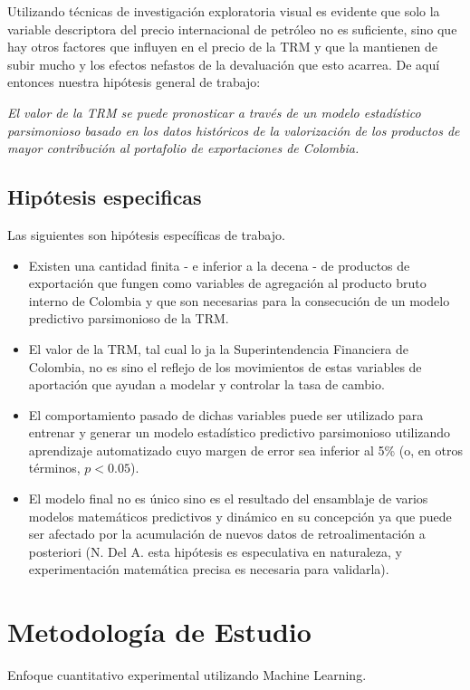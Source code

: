 \begin{spacing}{1.5}
Utilizando técnicas de investigación exploratoria visual es evidente que solo la variable descriptora del precio internacional de petróleo no es suficiente, sino que hay otros factores que influyen en el precio de la TRM y que la mantienen de subir mucho y los efectos nefastos de la devaluación que esto acarrea. De aquí entonces nuestra hipótesis general de trabajo:

\emph{El valor de la TRM se puede pronosticar a través de un modelo estadístico parsimonioso basado en los datos históricos de la valorización de los productos de mayor contribución al portafolio de exportaciones de Colombia.}

\subsection{Hipótesis especificas}
Las siguientes son hipótesis específicas de trabajo.

\begin{itemize}
	\item Existen una cantidad finita - e inferior a la decena - de productos de exportación que fungen como variables de agregación al producto bruto interno de Colombia y que son necesarias para la consecución de un modelo predictivo parsimonioso de la TRM.
	\item El valor de la TRM, tal cual lo ja la Superintendencia Financiera de Colombia, no es sino el reflejo de los movimientos de estas variables de aportación que ayudan a modelar y controlar la tasa de cambio.
	\item El comportamiento pasado de dichas variables puede ser utilizado para entrenar y generar un modelo estadístico predictivo parsimonioso utilizando aprendizaje automatizado cuyo margen de error sea inferior al 5\% (o, en otros términos, \(p < 0.05\)).
	\item El modelo final no es único sino es el resultado del ensamblaje de varios modelos matemáticos predictivos y dinámico en su concepción ya que puede ser afectado por la acumulación de nuevos datos de retroalimentación a posteriori (N. Del A. esta hipótesis es especulativa en naturaleza, y experimentación matemática precisa es necesaria para validarla).
\end{itemize}

\section{Metodología de Estudio}
Enfoque cuantitativo experimental utilizando Machine Learning.


\end{spacing}
